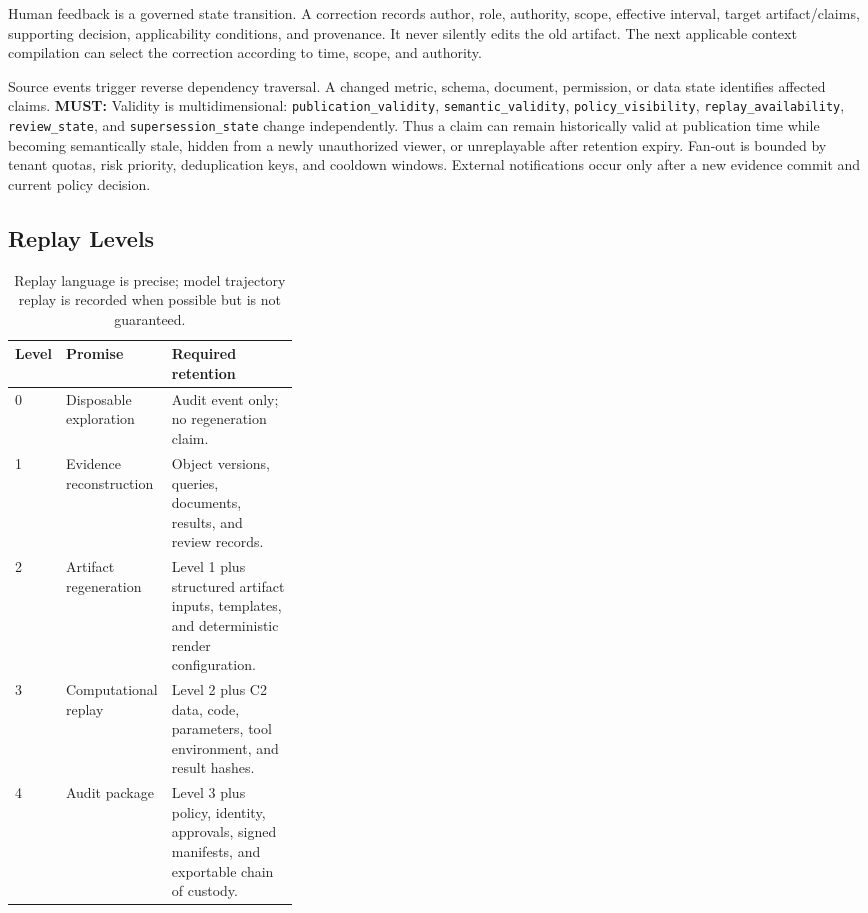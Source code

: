 \documentclass[10pt]{article}
\newcommand{\code}[1]{\texttt{#1}}
\newcommand{\must}{\textbf{\textcolor{amosblue}{MUST:}}\xspace}
\begin{document}
Human feedback is a governed state transition. A correction records author, role, authority, scope, effective interval, target artifact/claims, supporting decision, applicability conditions, and provenance. It never silently edits the old artifact. The next applicable context compilation can select the correction according to time, scope, and authority.

Source events trigger reverse dependency traversal. A changed metric, schema, document, permission, or data state identifies affected claims. \must Validity is multidimensional: \code{publication\_validity}, \code{semantic\_validity}, \code{policy\_visibility}, \code{replay\_availability}, \code{review\_state}, and \code{supersession\_state} change independently. Thus a claim can remain historically valid at publication time while becoming semantically stale, hidden from a newly unauthorized viewer, or unreplayable after retention expiry. Fan-out is bounded by tenant quotas, risk priority, deduplication keys, and cooldown windows. External notifications occur only after a new evidence commit and current policy decision.

\subsection{Replay Levels}

\begin{table}[ht]
\centering
\small
\begin{tabularx}{\linewidth}{C{0.08\linewidth}L{0.25\linewidth}Y}
\toprule
\textbf{Level} & \textbf{Promise} & \textbf{Required retention} \\
 & Disposable exploration & Audit event only; no regeneration claim. \\
1 & Evidence reconstruction & Object versions, queries, documents, results, and review records. \\
2 & Artifact regeneration & Level 1 plus structured artifact inputs, templates, and deterministic render configuration. \\
3 & Computational replay & Level 2 plus C2 data, code, parameters, tool environment, and result hashes. \\
4 & Audit package & Level 3 plus policy, identity, approvals, signed manifests, and exportable chain of custody. \\
\bottomrule
\end{tabularx}
\caption{Replay language is precise; model trajectory replay is recorded when possible but is not guaranteed.}
\end{table}
\end{document}
